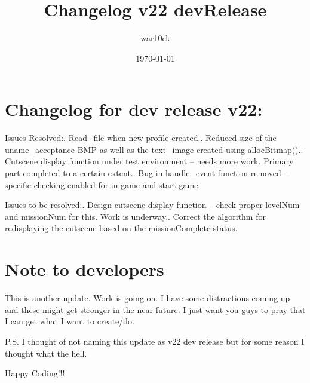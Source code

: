 \documentclass[a4paper]{article}
\begin{document}
\title{Changelog v22 devRelease}	%
\author{war10ck}	%
\date{\today}
\maketitle

\section{Changelog for dev release v22:}
Issues Resolved:. Read\_file when new profile created.. Reduced size of the uname\_acceptance BMP as well as the text\_image created using allocBitmap().. Cutscene display function under test environment -- needs more work. Primary part completed to a certain extent.. Bug in handle\_event function removed -- specific checking enabled for in-game and start-game.\newline

Issues to be resolved:. Design cutscene display function -- check proper levelNum and missionNum for this. Work is underway.. Correct the algorithm for redisplaying the cutscene based on the missionComplete status.\newline

\section{Note to developers}
This is another update. Work is going on. I have some distractions coming up and these might get stronger in the near future. I just want you guys to pray that I can get what I want to create/do.\newline

P.S. I thought of not naming this update as v22 dev release but for some reason I thought what the hell.\newline

Happy Coding!!!\newline
\pagebreak
\end{document}
